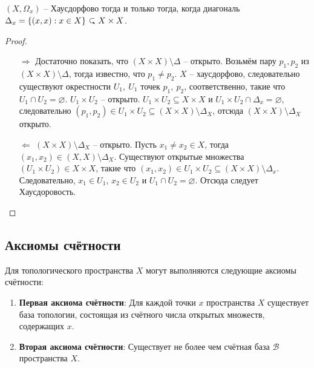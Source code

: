 \begin{statement}
	\((X, \Omega_x)\) -- Хаусдорфово тогда и только тогда, когда диагональ \(\Delta_x = \{(x, x): x \in X\} \closed X\times X\).
\end{statement}

\begin{proof} \
	\begin{itemize}
		\item[ \(\boxed{\Longrightarrow}\)] Достаточно показать, что \((X \times X) \setminus \Delta\) -- открыто. Возьмём пару \(p_1, p_2\) из \((X \times X) \setminus \Delta\), тогда известно, что \(p_1 \neq p_2\). \(X\) -- хаусдорфово, следовательно существуют окрестности \(U_1, \ U_1\) точек \(p_1, \ p_2\), соответственно, такие что \(U_1 \cap U_2 = \varnothing\). \(U_1 \times U_2\) -- открыто. \(U_1 \times U_2 \subseteq X \times X\) и \(U_1 \times U_2 \cap \Delta_x = \varnothing\), следовательно \((p_1, p_2) \in U_1 \times U_2 \subseteq \left(X \times X\right) \setminus \Delta_X\), отсюда \(\left(X \times X\right) \setminus \Delta_X\) открыто.
		\item[ \(\boxed{\Longleftarrow}\)]  \((X \times X) \setminus \Delta_X\) -- открыто. Пусть \(x_1 \neq x_2 \in X\), тогда \((x_1, x_2) \in (X, X)\setminus \Delta_X\). Существуют открытые множества \((U_1 \times U_2) \in X \times X\), такие что \((x_1, x_2) \in U_1 \times U_2 \subseteq (X \times X) \setminus \Delta_x\). Следовательно, \(x_1 \in U_1\), \(x_2 \in U_2\) и \(U_1 \cap U_2 = \varnothing\). Отсюда следует Хаусдоровость. 
	\end{itemize}
\end{proof}


\subsection{Аксиомы счётности}
Для топологического пространства \( X \) могут выполняются следующие аксиомы счётности:
\begin{enumerate}
    \item \textbf{Первая аксиома счётности}: Для каждой точки \( x \) пространства \( X \) существует база топологии, состоящая из счётного числа открытых множеств, содержащих \( x \).
    
    \item \textbf{Вторая аксиома счётности}: Существует не более чем счётная база $\mathcal{B}$ пространства $X$.
    \end{enumerate}

